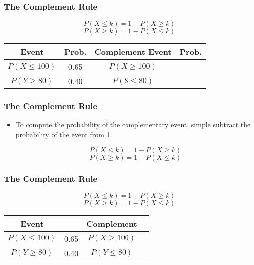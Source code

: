 \documentclass[IntroMain.tex]{subfiles}
\begin{document}
\begin{frame}
\frametitle{The Complement Rule}
\Large
\vspace{-2cm}
\[P(X \leq k) = 1- P(X \geq k) \]
\[P(X \geq k) = 1- P(X \leq k) \]
\begin{tabular}{|c|c|c|c|}
\hline Event &\phantom{s} Prob.\phantom{s} & Complement Event & \phantom{s} Prob.\phantom{s}\\ 
\hline $P(X \leq 100)$ & 0.65 &$P(X \geq 100)$  &  \\ 
\hline $P(Y \geq 80)$ & 0.40 & $P(8 \leq 80)$ &  \\ 
\hline 
\end{tabular} 

\end{frame}
\begin{frame}
\frametitle{The Complement Rule}
\Large
\vspace{-2cm}\begin{itemize}

\item To compute the probability of the complementary event, simple subtract the probability of the event from 1.

\[P(X \leq k) = 1- P(X \geq k) \]
\[P(X \geq k) = 1- P(X \leq k) \]
\end{itemize}
\end{frame}
\begin{frame}
\frametitle{The Complement Rule}
\Large
\begin{center}
\vspace{-2cm}
\[P(X \leq k) = 1- P(X \geq k) \]
\[P(X \geq k) = 1- P(X \leq k) \]
\begin{tabular}{|c|c|c|c|}
\hline Event &  & Complement  & \phantom{Event} \\ 
\hline $P(X \leq 100)$ & 0.65 &$P(X \geq 100)$  &  \\ 
\hline $P(Y \geq 80)$ & 0.40 & $P(Y \leq 80)$ &  \\ 
\hline 
\end{tabular} 
\end{center}
\end{frame}
\begin{frame}


\end{frame}
\end{document}
